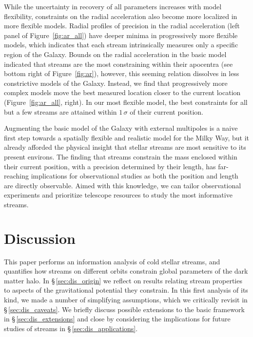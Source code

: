 \documentclass[modern]{aastex61}
\begin{document}
While the uncertainty in recovery of all parameters increases with model flexibility, constraints on the radial acceleration also become more localized in more flexible models.
Radial profiles of precision in the radial acceleration (left panel of Figure~\ref{fig:ar_all}) have deeper minima in progressively more flexible models, which indicates that each stream intrinsically measures only a specific region of the Galaxy.
Bounds on the radial acceleration in the basic model indicated that streams are the most constraining within their apocentra (see bottom right of Figure~\ref{fig:ar}), however, this seeming relation dissolves in less constrictive models of the Galaxy.
Instead, we find that progressively more complex models move the best measured location closer to the current location (Figure~\ref{fig:ar_all}, right).
In our most flexible model, the best constraints for all but a few streams are attained within $1\,\sigma$ of their current position.


Augmenting the basic model of the Galaxy with external multipoles is a naive first step towards a spatially flexible and realistic model for the Milky Way, but it already afforded the physical insight that stellar streams are most sensitive to its present environs.
The finding that streams constrain the mass enclosed within their current position, with a precision determined by their length, has far-reaching implications for observational studies as both the position and length are directly observable.
Aimed with this knowledge, we can tailor observational experiments and prioritize telescope resources to study the most informative streams.

\section{Discussion}
\label{sec:discussion}
This paper performs an information analysis of cold stellar streams, and quantifies how streams on different orbits constrain global parameters of the dark matter halo.
In \S\,\ref{sec:dis_origin} we reflect on results relating stream properties to aspects of the gravitational potential they constrain.
In this first analysis of its kind, we made a number of simplifying assumptions, which we critically revisit in \S\,\ref{sec:dis_caveats}.
We briefly discuss possible extensions to the basic framework in \S\,\ref{sec:dis_extensions} and close by considering the implications for future studies of streams in \S\,\ref{sec:dis_applications}.
\end{document}

